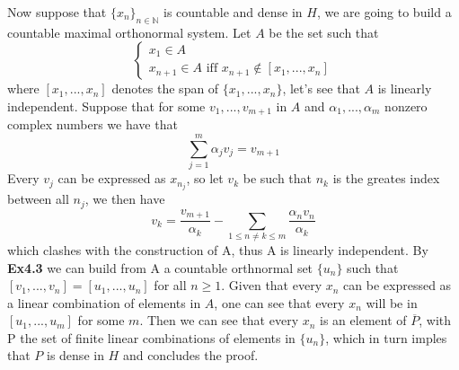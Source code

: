 \documentclass{article}
\begin{document}
\begin{exercise}
Now suppose that $\{x_n\}_{n \in \mathbb{N}}$ is countable and dense in $H$, we are going to build a countable maximal orthonormal system. Let $A$ be the set such that
\[
   \begin{cases}
      x_1 \in A \\
      x_{n+1} \in A \text{ iff } x_{n+1} \notin [ x_1, ..., x_n ]
   \end{cases} 
\]
where $[x_1, ..., x_n]$ denotes the span of $\{x_1, ..., x_n\}$, let's see that $A$ is linearly independent. Suppose that for some $v_1, ..., v_{m+1}$ in $A$ and $\alpha_1, ..., \alpha_m$ nonzero complex numbers we have that
\[
    \sum_{j=1}^{m} \alpha_j v_j = v_{m+1}
\]
Every $v_j$ can be expressed as $x_{n_j}$, so let $v_k$ be such that $n_k$ is the greates index between all $n_j$, we then have
\[
    v_k = \frac{v_{m+1}}{\alpha_k} - \sum_{1 \le n \neq k \le m} \frac{\alpha_n v_n}{\alpha_k}
\]
which clashes with the construction of A, thus A is linearly independent. By \textbf{Ex4.3} we can build from A a countable orthnormal set $\{u_n\}$ such that $[v_1, ..., v_n] = [u_1, ..., u_n]$ for all $n \ge 1$. Given that every $x_n$ can be expressed as a linear combination of elements in $A$, one can see that every $x_n$ will be in $[u_1, ..., u_m]$ for some $m$. Then we can see that every $x_n$ is an element of $\overline{P}$, with P the set of finite linear combinations of elements in $\{u_n\}$, which in turn imples that $P$ is dense in $H$ and concludes the proof. 
\end{exercise}

\bigbreak
\end{document}
